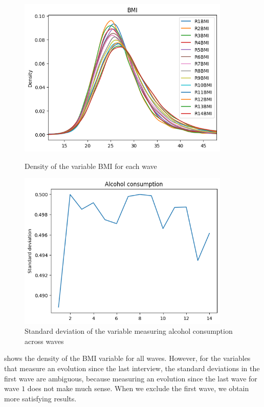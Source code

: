 \documentclass[]{article}
\begin{document}
\begin{figure}[!h]
	\centering
	\begin{minipage}{0.45\textwidth}
		\centering
		\includegraphics[width=0.9\textwidth]{density_bmi.png}
		\caption{Density of the variable BMI for each wave}
		\label{density_bmi}
	\end{minipage}\hfill
	\begin{minipage}{0.45\textwidth}
		\centering
		\includegraphics[width=0.9\textwidth]{std_alcohol.png}
		\caption{Standard deviation of the variable measuring alcohol consumption across waves}
		\label{std_alcohol}
	\end{minipage}
\end{figure}
shows the density of the BMI variable for all waves. However, for the variables that measure an evolution since the last interview, the standard deviations in the first wave are ambiguous, because measuring an evolution since the last wave for wave $1$ does not make much sense. When we exclude the first wave, we obtain more satisfying results.\\
\end{document}
